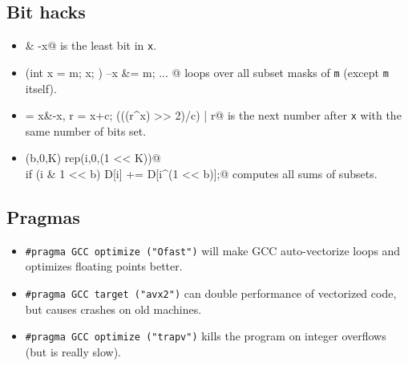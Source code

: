 	\subsection{Bit hacks}
		\begin{itemize}
			\item \verb@x & -x@ is the least bit in \texttt{x}.
			\item \verb@for (int x = m; x; ) { --x &= m; ... }@ loops over all subset masks of \texttt{m} (except \texttt{m} itself).
			\item \verb@c = x&-x, r = x+c; (((r^x) >> 2)/c) | r@ is the next number after \texttt{x} with the same number of bits set.
			\item \verb@rep(b,0,K) rep(i,0,(1 << K))@ \\ \verb@  if (i & 1 << b) D[i] += D[i^(1 << b)];@ computes all sums of subsets.
		\end{itemize}
	\subsection{Pragmas}
		\begin{itemize}
			\item \lstinline{#pragma GCC optimize ("Ofast")} will make GCC auto-vectorize loops and optimizes floating points better.
			\item \lstinline{#pragma GCC target ("avx2")} can double performance of vectorized code, but causes crashes on old machines.
			\item \lstinline{#pragma GCC optimize ("trapv")} kills the program on integer overflows (but is really slow).
		\end{itemize}


